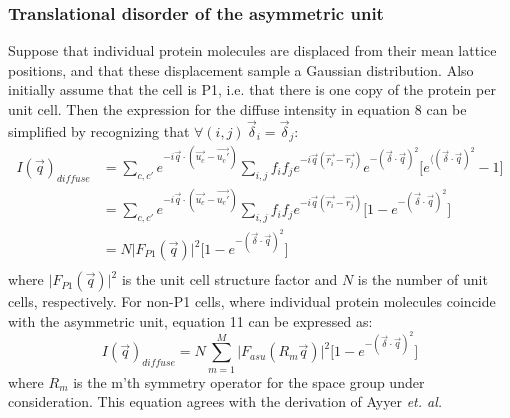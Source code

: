 \documentclass{article}
\begin{document}
\subsubsection{Translational disorder of the asymmetric unit} Suppose that individual protein molecules are displaced from their mean lattice positions, and that these displacement sample a Gaussian distribution. Also initially assume that the cell is P1, i.e. that there is one copy of the protein per unit cell. Then the expression for the diffuse intensity in equation 8 can be simplified by recognizing that $\forall(i,j) \, \vec{\delta}_i = \vec{\delta}_j$:
\begin{equation}
\begin{aligned}
I(\vec{q})_{diffuse} & = \sum\limits_{c,c'} e^{-i \vec{q} \cdot (\vec{u_c} - \vec{u_c'})} \sum\limits_{i,j} f_i f_j e^{-i \vec{q} (\vec{r_i} - \vec{r_j})} e^{-(\vec{\delta} \cdot \vec{q})^2} \lbrack e^{\langle ( \vec{\delta} \cdot \vec{q} )^2 } - 1 \rbrack \\
& = \sum\limits_{c,c'} e^{-i \vec{q} \cdot (\vec{u_c} - \vec{u_c'})} \sum\limits_{i,j} f_i f_j e^{-i \vec{q} (\vec{r_i} - \vec{r_j})} \lbrack 1 - e^{ - ( \vec{\delta} \cdot \vec{q} )^2 } \rbrack \\
& = N \vert F_{P1}(\vec{q}) \vert ^2 \lbrack 1 - e^{ - ( \vec{\delta} \cdot \vec{q} )^2 } \rbrack \\
\end{aligned}
\end{equation}
where $\vert F_{P1}(\vec{q}) \vert ^2$ is the unit cell structure factor and $N$ is the number of unit cells, respectively. For non-P1 cells, where individual protein molecules coincide with the asymmetric unit, equation 11 can be expressed as:
\begin{equation}
I(\vec{q})_{diffuse} = N \sum\limits_{m=1}^M \vert F_{asu}(R_m\vec{q}) \vert ^2 \lbrack 1 - e^{ - ( \vec{\delta} \cdot \vec{q} )^2 } \rbrack
\end{equation}
where $R_m$ is the m'th symmetry operator for the space group under consideration. This equation agrees with the derivation of Ayyer \textit{et. al.} \cite{pmid26863980}
\end{document}
